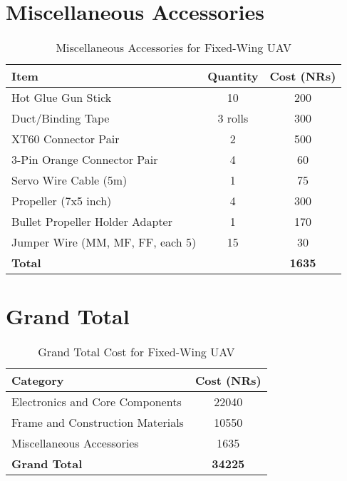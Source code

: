 \section*{Miscellaneous Accessories}
\begin{table}[h]
\centering
\begin{tabular}{l c S[table-format=4.0]}
\toprule
\textbf{Item} & \textbf{Quantity} & \textbf{Cost (NRs)} \\
\midrule
Hot Glue Gun Stick & 10 & 200 \\
Duct/Binding Tape & 3 rolls & 300 \\
XT60 Connector Pair & 2 & 500 \\
3-Pin Orange Connector Pair & 4 & 60 \\
Servo Wire Cable (5m) & 1 & 75 \\
Propeller (7x5 inch) & 4 & 300 \\
Bullet Propeller Holder Adapter & 1 & 170 \\
Jumper Wire (MM, MF, FF, each 5) & 15 & 30 \\
\midrule
\textbf{Total} & & \textbf{1635} \\
\bottomrule
\end{tabular}
\caption{Miscellaneous Accessories for Fixed-Wing UAV}
\end{table}

\section*{Grand Total}
\begin{table}[h]
\centering
\begin{tabular}{l S[table-format=5.0]}
\toprule
\textbf{Category} & \textbf{Cost (NRs)} \\
\midrule
Electronics and Core Components & 22040 \\
Frame and Construction Materials & 10550 \\
Miscellaneous Accessories & 1635 \\
\midrule
\textbf{Grand Total} & \textbf{34225} \\
\bottomrule
\end{tabular}
\caption{Grand Total Cost for Fixed-Wing UAV}
\end{table}
